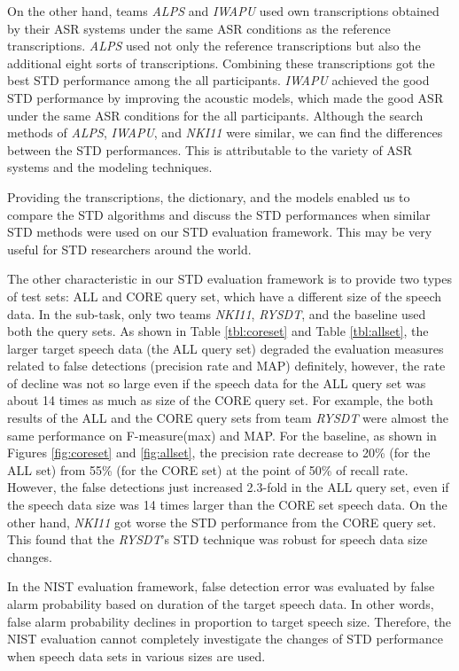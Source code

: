 \documentclass[english]{jnlp_1.4}
\begin{document}
On the other hand, teams {\it ALPS} and {\it IWAPU} used own 
transcriptions obtained by their ASR systems under the same ASR 
conditions as the reference transcriptions. {\it ALPS} used not only the 
reference transcriptions but also the additional eight sorts of 
transcriptions. Combining these transcriptions got the best STD 
performance among the all participants. {\it IWAPU} achieved the good 
STD performance by improving the acoustic models, which made the good 
ASR under the same ASR conditions for the all participants. Although the 
search methods of {\it ALPS}, {\it IWAPU}, and {\it NKI11} were similar, 
we can find the differences between the STD performances. This is 
attributable to the variety of ASR systems and the modeling techniques. 

Providing the transcriptions, the dictionary, and the models enabled us 
to compare the STD algorithms and discuss the STD performances when 
similar STD methods were used on our STD evaluation framework. This may 
be very useful for STD researchers around the world. 

The other characteristic in our STD evaluation framework is to provide 
two types of test sets: ALL and CORE query set, which have a different 
size of the speech data. In the sub-task, only two teams {\it NKI11}, 
\textit{RYSDT}, and the baseline used both the query sets. As shown in Table 
\ref{tbl:coreset} and Table \ref{tbl:allset}, the larger target speech 
data (the ALL query set) degraded the evaluation measures related to 
false detections (precision rate and MAP) definitely, however, the rate 
of decline was not so large even if the speech data for the ALL query 
set was about 14 times as much as size of the CORE query set. For 
example, the both results of the ALL and the CORE query sets from team 
{\it RYSDT} were almost the same performance on F-measure(max) and MAP. 
For the baseline, as shown in Figures \ref{fig:coreset} and 
\ref{fig:allset}, the precision rate decrease to 20\% (for the ALL set) 
from 55\% (for the CORE set) at the point of 50\% of recall rate. 
However, the false detections just increased 2.3-fold in the ALL query 
set, even if the speech data size was 14 times larger than the CORE set 
speech data. On the other hand, \textit{NKI11} got worse the STD 
performance from the CORE query set. This found that the \textit{RYSDT}'s 
STD technique was robust for speech data size changes. 

In the NIST evaluation framework, false detection error was evaluated by 
false alarm probability based on duration of the target speech data. In 
other words, false alarm probability declines in proportion to target 
speech size. Therefore, the NIST evaluation cannot completely 
investigate the changes of STD performance when speech data sets in 
various sizes are used. 
\end{document}
